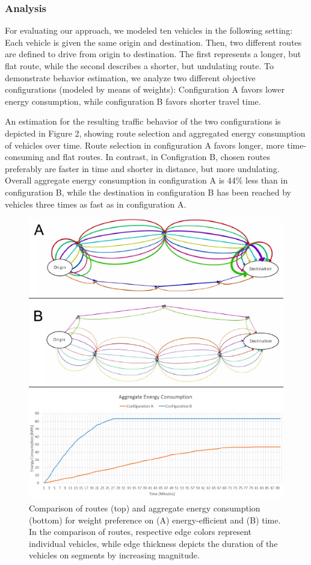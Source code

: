 \documentclass[conference]{../cls/IEEEtran}
\begin{document}
\subsubsection*{Analysis}

For evaluating our approach, we modeled ten vehicles in the following setting: Each vehicle is given the same origin and destination. Then, two different routes are defined to drive from origin to destination. The first represents a longer, but flat route, while the second describes a shorter, but undulating route. To demonstrate behavior estimation, we analyze two different objective configurations (modeled by means of weights): Configuration A favors lower energy consumption, while configuration B favors shorter travel time.

An estimation for the resulting traffic behavior of the two
configurations is depicted in Figure 2, showing route selection
and aggregated energy consumption of vehicles over time. Route selection in
configuration A favors longer, more time-consuming and flat routes. In contrast,
in Configration B, chosen routes preferably are faster in time and
shorter in distance, but more undulating. Overall aggregate energy consumption
in configuration A is 44\% less than in configuration B, while the destination in configuration B has been reached
by vehicles three times as fast as in configuration A.

\begin{figure}[t!]
	\includegraphics[width=\columnwidth]{../gfx/results.pdf}
	\caption{Comparison of routes (top) and aggregate energy consumption
	(bottom) for weight preference  on (A) energy-efficient and (B) time.
	In the comparison of routes, respective edge colors represent individual
	vehicles, while edge thickness depicts the duration of the vehicles
	on segments by increasing magnitude.
	}
	\label{figure:results}
\end{figure}
\end{document}

